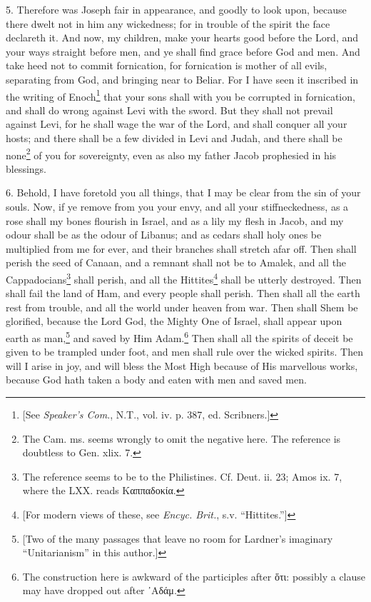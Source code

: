 5. Therefore was Joseph fair in appearance, and goodly to look upon, because there dwelt not in him any wickedness; for in trouble of the spirit the face declareth it. And now, my children, make your hearts good before the Lord, and your ways straight before men, and ye shall find grace before God and men. And take heed not to commit fornication, for fornication is mother of all evils, separating from God, and bringing near to Beliar. For I have seen it inscribed in the writing of Enoch\footnote{[See \emph{Speaker’s Com}., N.T., vol. iv. p. 387, ed. Scribners.]} that your sons shall with you be corrupted in fornication, and shall do wrong against Levi with the sword. But they shall not prevail against Levi, for he shall wage the war of the Lord, and shall conquer all your hosts; and there shall be a few divided in Levi and Judah, and there shall be none\footnote{The Cam. ms. seems wrongly to omit the negative here. The reference is doubtless to Gen. xlix. 7.} of you for sovereignty, even as also my father Jacob prophesied in his blessings.

6. Behold, I have foretold you all things, that I may be clear from the sin of your souls. Now, if ye remove from you your envy, and all your stiffneckedness, as a rose shall my bones flourish in Israel, and as a lily my flesh in Jacob, and my odour shall be as the odour of Libanus; and as cedars shall holy ones be multiplied from me for ever, and their branches shall stretch afar off. Then shall perish the seed of Canaan, and a remnant shall not be to Amalek, and all the Cappadocians\footnote{The reference seems to be to the Philistines. Cf. Deut. ii. 23; Amos ix. 7, where the LXX. reads \textgreek{Καππαδοκία}.} shall perish, and all the Hittites\footnote{[For modern views of these, see \emph{Encyc. Brit.}, s.v. “Hittites.”]} shall be utterly destroyed. Then shall fail the land of Ham, and every people shall perish. Then shall all the earth rest from trouble, and all the world under heaven from war. Then shall Shem be glorified, because the Lord God, the Mighty One of Israel, shall appear upon earth as man,\footnote{[Two of the many passages that leave no room for Lardner’s imaginary “Unitarianism” in this author.]} and saved by Him Adam.\footnote{The construction here is awkward of the participles after \textgreek{ὅτι}: possibly a clause may have dropped out after \textgreek{᾽Αδάμ}.} Then shall all the spirits of deceit be given to be trampled under foot, and men shall rule over the wicked spirits. Then will I arise in joy, and will bless the Most High because of His marvellous works, because God hath taken a body and eaten with men and saved men.

